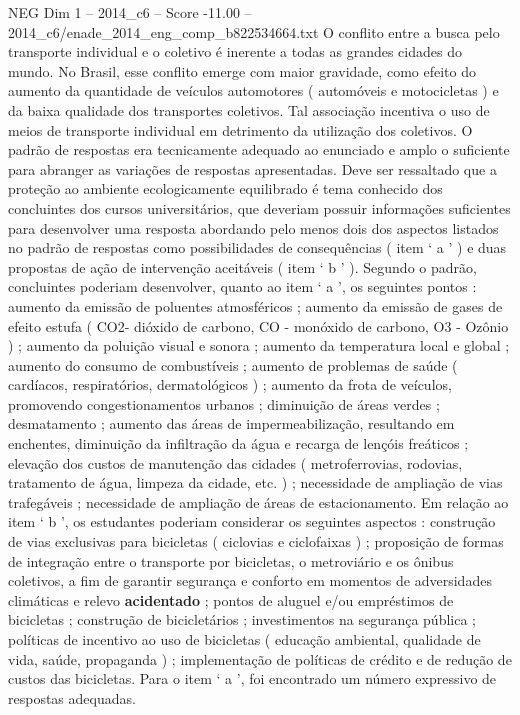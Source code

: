 \begin{textsample}{NEG Dim 1 – 2014\_c6 – Score -11.00 – 2014\_c6/enade\_2014\_eng\_comp\_b822534664.txt}
O conflito entre a busca pelo transporte individual e o coletivo é inerente a todas as grandes cidades do mundo.
No Brasil, esse conflito emerge com maior gravidade, como efeito do aumento da quantidade de veículos automotores ( automóveis e motocicletas ) e da baixa qualidade dos transportes coletivos.
Tal associação incentiva o uso de meios de transporte individual em detrimento da utilização dos coletivos.
O padrão de respostas era tecnicamente adequado ao enunciado e amplo o suficiente para abranger as variações de respostas apresentadas.
Deve ser ressaltado que a proteção ao ambiente ecologicamente equilibrado é tema conhecido dos concluintes dos cursos universitários, que deveriam possuir informações suficientes para desenvolver uma resposta abordando pelo menos dois dos aspectos listados no padrão de respostas como possibilidades de consequências ( item ‘ a ’ ) e duas propostas de ação de intervenção aceitáveis ( item ‘ b ’ ).
Segundo o padrão, concluintes poderiam desenvolver, quanto ao item ‘ a ’, os seguintes pontos : aumento da emissão de poluentes atmosféricos ; aumento da emissão de gases de efeito estufa ( CO2- dióxido de carbono, CO - monóxido de carbono, O3 - Ozônio ) ; aumento da poluição visual e sonora ; aumento da temperatura local e global ; aumento do consumo de combustíveis ; aumento de problemas de saúde ( cardíacos, respiratórios, dermatológicos ) ; aumento da frota de veículos, promovendo congestionamentos urbanos ; diminuição de áreas verdes ; desmatamento ; aumento das áreas de impermeabilização, resultando em enchentes, diminuição da infiltração da água e recarga de lençóis freáticos ; elevação dos custos de manutenção das cidades ( metroferrovias, rodovias, tratamento de água, limpeza da cidade, etc. ) ; necessidade de ampliação de vias trafegáveis ; necessidade de ampliação de áreas de estacionamento.
Em relação ao item ‘ b ’, os estudantes poderiam considerar os seguintes aspectos : construção de vias exclusivas para bicicletas ( ciclovias e ciclofaixas ) ; proposição de formas de integração entre o transporte por bicicletas, o metroviário e os ônibus coletivos, a fim de garantir segurança e conforto em momentos de adversidades climáticas e relevo \textbf{acidentado} ; pontos de aluguel e/ou empréstimos de bicicletas ; construção de bicicletários ; investimentos na segurança pública ; políticas de incentivo ao uso de bicicletas ( educação ambiental, qualidade de vida, saúde, propaganda ) ; implementação de políticas de crédito e de redução de custos das bicicletas.
Para o item ‘ a ’, foi encontrado um número expressivo de respostas adequadas.

\end{textsample}
